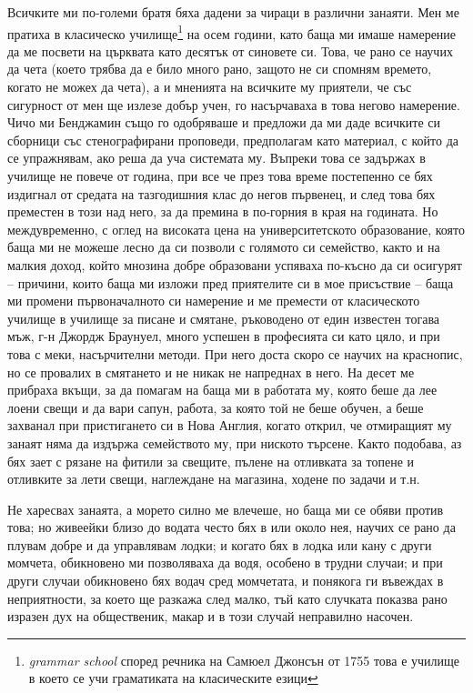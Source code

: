 \documentclass[12pt]{book}
\begin{document}
Всичките ми по-големи братя бяха дадени за чираци в различни занаяти. Мен ме пратиха в класическо училище\footnote{\textit{ grammar school } според речника на Самюел Джонсън от 1755 това е училище в което се учи граматиката на класическите езици} на осем години, като баща ми имаше намерение да ме посвети на църквата като десятък от синовете си. Това, че рано се научих да чета (което трябва да е било много рано, защото не си спомням времето, когато не можех да чета), а и мненията на всичките му приятели, че със сигурност от мен ще излезе добър учен, го насърчаваха в това негово намерение. Чичо ми Бенджамин също го одобряваше и предложи да ми даде всичките си сборници със стенографирани проповеди, предполагам като материал, с който да се упражнявам, ако реша да уча системата му. Въпреки това се задържах в училище не повече от година, при все че през това време постепенно се бях издигнал от средата на тазгодишния клас до негов първенец, и след това бях преместен в този над него, за да премина в по-горния в края на годината. Но междувременно, с оглед на високата цена на университетското образование, която баща ми не можеше лесно да си позволи с голямото си семейство, както и на малкия доход, който мнозина добре образовани успяваха по-късно да си осигурят – причини, които баща ми изложи пред приятелите си в мое присъствие – баща ми промени първоначалното си намерение и ме премести от класическото училище в училище за писане и смятане, ръководено от един известен тогава мъж, г-н Джордж Браунуел, много успешен в професията си като цяло, и при това с меки, насърчителни методи. При него доста скоро се научих на краснопис, но се провалих в смятането и не никак не напреднах в него. На десет ме прибраха вкъщи, за да помагам на баща ми в работата му, която беше да лее лоени свещи и да вари сапун, работа, за която той не беше обучен, а беше захванал при пристигането си в Нова Англия, когато открил, че отмиращият му занаят няма да издържа семейството му, при ниското търсене. Както подобава, аз бях зает с рязане на фитили за свещите, пълене на отливката за топене и отливките за лети свещи, наглеждане на магазина, ходене по задачи и т.н.
 
Не харесвах занаята, а морето силно ме влечеше, но баща ми се обяви против това; но живеейки близо до водата често бях в или около нея, научих се рано да плувам добре и да управлявам лодки; и когато бях в лодка или кану с други момчета, обикновено ми позволяваха да водя, особено в трудни случаи; и при други случаи обикновено бях водач сред момчетата, и понякога ги въвеждах в неприятности, за което ще разкажа след малко, тъй като случката показва рано изразен дух на общественик, макар и в този случай неправилно насочен.
\end{document}

